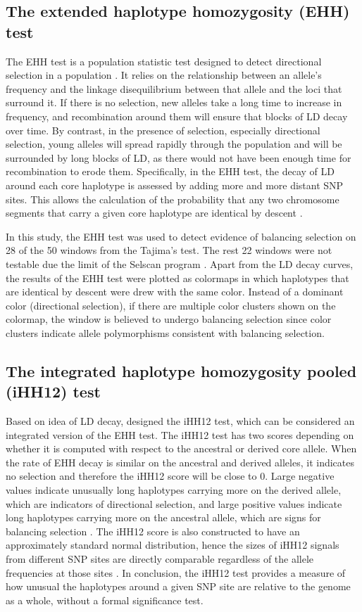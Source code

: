 \subsection{The extended haplotype homozygosity (EHH) test}
The EHH test is a population statistic test designed to detect directional selection in a population \citep{RN14}. It relies on the relationship between an allele's frequency and the linkage disequilibrium between that allele and the loci that surround it. If there is no selection, new alleles take a long time to increase in frequency, and recombination around them will ensure that blocks of LD decay over time. By contrast, in the presence of selection, especially directional selection, young alleles will spread rapidly through the population and will be surrounded by long blocks of LD, as there would not have been enough time for recombination to erode them. Specifically, in the EHH test, the decay of LD around each core haplotype is assessed by adding more and more distant SNP sites. This allows the calculation of the probability that any two chromosome segments that carry a given core haplotype are identical by descent \citep{RN14}.

In this study, the EHH test was used to detect evidence of balancing selection on 28 of the 50 windows from the Tajima’s test. The rest 22 windows were not testable due the limit of the Selscan program \citep{RN15}. Apart from the LD decay curves, the results of the EHH test were plotted as colormaps in which haplotypes that are identical by descent were drew with the same color. Instead of a dominant color (directional selection), if there are multiple color clusters shown on the colormap, the window is believed to undergo balancing selection since color clusters indicate allele polymorphisms consistent with balancing selection.

\subsection{The integrated haplotype homozygosity pooled (iHH12) test}
Based on idea of LD decay, \citet{RN16} designed the iHH12 test, which can be considered an integrated version of the EHH test. The iHH12 test has two scores depending on whether it is computed with respect to the ancestral or derived core allele. When the rate of EHH decay is similar on the ancestral and derived alleles, it indicates no selection and therefore the iHH12 score will be close to 0. Large negative values indicate unusually long haplotypes carrying more on the derived allele, which are indicators of directional selection, and large positive values indicate long haplotypes carrying more on the ancestral allele, which are signs for balancing selection \citep{RN16}. The iHH12 score is also constructed to have an approximately standard normal distribution, hence the sizes of iHH12 signals from different SNP sites are directly comparable regardless of the allele frequencies at those sites \citep{RN16}. In conclusion, the iHH12 test provides a measure of how unusual the haplotypes around a given SNP site are relative to the genome as a whole, without a formal significance test.

